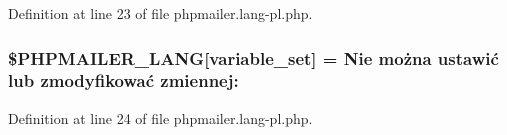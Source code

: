 Definition at line 23 of file phpmailer.\+lang-\/pl.\+php.

\subsubsection[{\texorpdfstring{\$\+P\+H\+P\+M\+A\+I\+L\+E\+R\+\_\+\+L\+A\+NG}{$PHPMAILER_LANG}}]{\setlength{\rightskip}{0pt plus 5cm}\$P\+H\+P\+M\+A\+I\+L\+E\+R\+\_\+\+L\+A\+NG\mbox{[}\textquotesingle{}variable\+\_\+set\textquotesingle{}\mbox{]} = \textquotesingle{}Nie można ustawić lub zmodyfikować zmiennej\+: \textquotesingle{}}\hypertarget{phpmailer_8lang-pl_8php_af795debc7a739d038742691c358d9032}{}\label{phpmailer_8lang-pl_8php_af795debc7a739d038742691c358d9032}


Definition at line 24 of file phpmailer.\+lang-\/pl.\+php.

